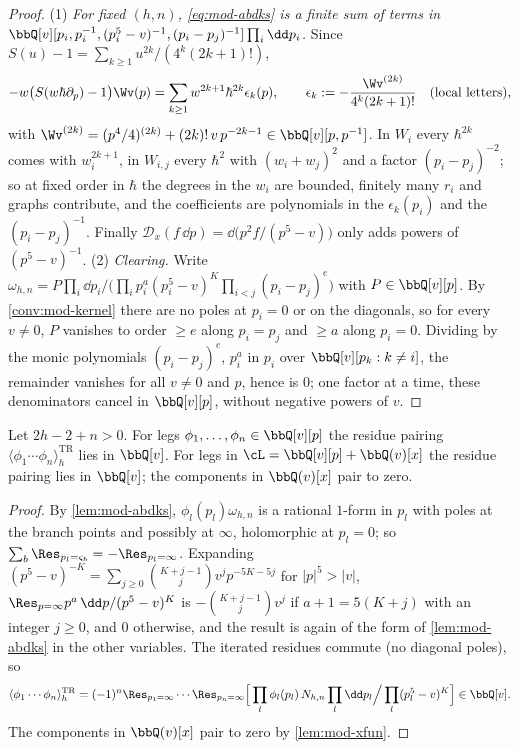 \begin{proof}
(1) \emph{For fixed $(h,n)$, \eqref{eq:mod-abdks} is a finite sum of terms in $\bbQ[v][p_i,p_i^{-1},(p_i^5-v)^{-1},(p_i-p_j)^{-1}]\prod_i\dd p_i$.} Since $S(u)-1=\sum_{k\geq 1}u^{2k}/(4^k(2k+1)!)$,
\[
-w\big(S(w\hbar\partial_p)-1\big)\Wv(p)=\sum_{k\geq 1}w^{2k+1}\hbar^{2k}\epsilon_k(p),\qquad \epsilon_k:=-\frac{\Wv^{(2k)}}{4^k(2k+1)!}\quad(\text{local letters}),
\]
with $\Wv^{(2k)}=(p^4/4)^{(2k)}+(2k)!\,v\,p^{-2k-1}\in\bbQ[v][p,p^{-1}]$. In $W_i$ every $\hbar^{2k}$ comes with $w_i^{2k+1}$, in $W_{i,j}$ every $\hbar^2$ with $(w_i+w_j)^2$ and a factor $(p_i-p_j)^{-2}$; so at fixed order in $\hbar$ the degrees in the $w_i$ are bounded, finitely many $r_i$ and graphs contribute, and the coefficients are polynomials in the $\epsilon_k(p_i)$ and the $(p_i-p_j)^{-1}$. Finally $\mathcal D_x(f\,\dd p)=\dd\big(p^2f/(p^5-v)\big)$ only adds powers of $(p^5-v)^{-1}$. (2) \emph{Clearing.} Write $\omega_{h,n}=P\prod_i\dd p_i\big/\big(\prod_ip_i^{a}(p_i^5-v)^{K}\prod_{i<j}(p_i-p_j)^{e}\big)$ with $P\in\bbQ[v][p]$. By \cref{conv:mod-kernel} there are no poles at $p_i=0$ or on the diagonals, so for every $v\neq 0$, $P$ vanishes to order $\geq e$ along $p_i=p_j$ and $\geq a$ along $p_i=0$. Dividing by the monic polynomials $(p_i-p_j)^e$, $p_i^a$ in $p_i$ over $\bbQ[v][p_k:k\neq i]$, the remainder vanishes for all $v\neq 0$ and $p$, hence is $0$; one factor at a time, these denominators cancel in $\bbQ[v][p]$, without negative powers of $v$.
\end{proof}

\begin{thm}[L-regularity]
\label{thm:mod-Lreg}
Let $2h-2+n>0$. For legs $\phi_1,\dots,\phi_n\in\bbQ[v][p]$ the residue pairing $\langle\phi_1\cdots\phi_n\rangle^{\mathrm{TR}}_h$ lies in $\bbQ[v]$. For legs in $\cL=\bbQ[v][p]+\bbQ(v)[x]$ the residue pairing lies in $\bbQ[v]$; the components in $\bbQ(v)[x]$ pair to zero.
\end{thm}

\begin{proof}
By \cref{lem:mod-abdks}, $\phi_l(p_l)\omega_{h,n}$ is a rational $1$-form in $p_l$ with poles at the branch points and possibly at $\infty$, holomorphic at $p_l=0$; so $\sum_b\Res_{p_l=\varsigma_b}=-\Res_{p_l=\infty}$. Expanding $(p^5-v)^{-K}=\sum_{j\geq 0}\binom{K+j-1}{j}v^jp^{-5K-5j}$ for $|p|^5>|v|$, $\Res_{p=\infty}p^a\,\dd p/(p^5-v)^K$ is $-\binom{K+j-1}{j}v^j$ if $a+1=5(K+j)$ with an integer $j\geq 0$, and $0$ otherwise, and the result is again of the form of \cref{lem:mod-abdks} in the other variables. The iterated residues commute (no diagonal poles), so
\[
\langle\phi_1\cdots\phi_n\rangle^{\mathrm{TR}}_h=(-1)^n\Res_{p_1=\infty}\cdots\Res_{p_n=\infty}\Big[\prod_l\phi_l(p_l)\,N_{h,n}\prod_l\dd p_l\Big/\prod_l(p_l^5-v)^K\Big]\in\bbQ[v].
\] The components in $\bbQ(v)[x]$ pair to zero by \cref{lem:mod-xfun}.
\end{proof}

